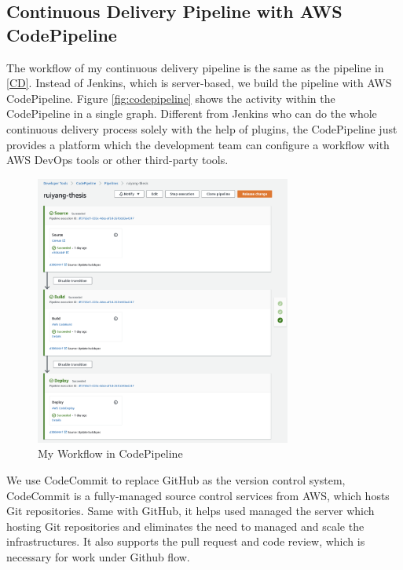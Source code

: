 \subsection{Continuous Delivery Pipeline with AWS CodePipeline}
The workflow of my continuous delivery pipeline is the same as the pipeline in \ref{CD}. Instead of Jenkins, which is server-based, we build the pipeline with AWS CodePipeline. Figure \ref{fig:codepipeline} shows the activity within the CodePipeline in a single graph. Different from Jenkins who can do the whole continuous delivery process solely with the help of plugins, the CodePipeline just provides a platform which the development team can configure a workflow with AWS DevOps tools or other third-party tools. 
\begin{figure}[h]
     \centering
     \includegraphics[width=0.75\textwidth]{pics/cp-interface.png}
     \caption{My Workflow in CodePipeline}
     \label{fig:cp-edit}
    \end{figure}
\par
We use CodeCommit to replace GitHub as the version control system, CodeCommit is a fully-managed source control services \cite{AWSCodeC33:online} from AWS, which hosts Git repositories. Same with GitHub, it helps used managed the server which hosting Git repositories and eliminates the need to managed and scale the infrastructures. It also supports the pull request and code review, which is necessary for work under Github flow. 
